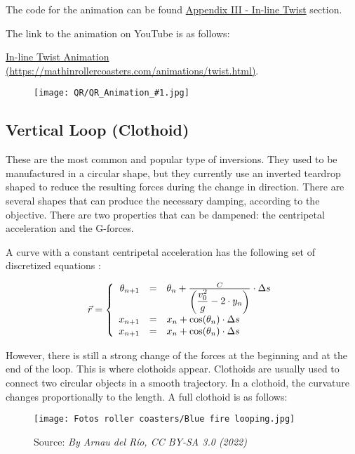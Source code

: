 \documentclass[12pt,twoside,a4paper]{article}
\newcommand{\ds}{\displaystyle}
\newcommand{\source}[1]{\caption*{Source: \textit{#1}} }
\newcommand{\link}[1]{https://mathinrollercoasters.com/animations/#1.html}
\newcommand{\LinkToAnimation}[2]{
\noindent The code for the animation can be found \hyperref[sec:Appendix III_#1]{Appendix III - #1} section.

\noindent The link to the animation on YouTube is as follows:
	
\noindent \href{\link{#2}}{#1 Animation (\link{#2})}.
	
\begin{figure}[H]
	\centering
	\texttt{[image: QR/QR\_Animation\_\#1.jpg]}
\end{figure}
}
\begin{document}
	\LinkToAnimation{In-line Twist}{twist}
	
	\cleardoublepage
	
	\subsection{Vertical Loop (Clothoid)}
	These are the most common and popular type of inversions. They used to be manufactured in a circular shape, but they currently use an inverted teardrop shaped to reduce the resulting forces during the change in direction. There are several shapes that can produce the necessary damping, according to the objective. There are two properties that can be dampened: the centripetal acceleration and the G-forces.
	
	A curve with a constant centripetal acceleration has the following set of discretized equations \cite{PhysicsRollerCoasterLoops}:
	
	$$\vec{r} = \left\{\begin{array}{rcl}
		\theta_{n+1} & = & \theta_n + \frac{C}{\left(\ds \frac{v_0^2}{g} - 2 \cdot y_n\right)} \cdot \Delta s \cr
		x_{n+1} & = & x_n + \cos(\theta_n) \cdot \Delta s \cr
		x_{n+1} & = & x_n + \cos(\theta_n) \cdot \Delta s \cr
	\end{array}\right.$$
	
	However, there is still a strong change of the forces at the beginning and at the end of the loop. This is where clothoids appear. Clothoids are usually used to connect two circular objects in a smooth trajectory. In a clothoid, the curvature changes proportionally to the length. A full clothoid is as follows:
	

	\begin{figure}[H]
		\centering
		\texttt{[image: Fotos roller coasters/Blue fire looping.jpg]}
		\caption{Vertical Loop of the Blue Fire Megacoaster, Europa Park}
		\label{fig:Blue Fire Vertical Loop}
		\source{By Arnau del Río, CC BY-SA 3.0 (2022)}
	\end{figure}
	
\end{document}
